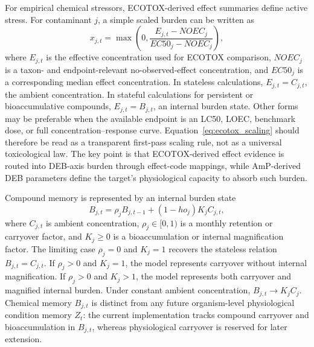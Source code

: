 For empirical chemical stressors, ECOTOX-derived effect summaries define active stress. For contaminant $j$, a simple scaled burden can be written as
\begin{equation}
  x_{j,t} = \max\left(0,\frac{E_{j,t}-NOEC_j}{EC50_j-NOEC_j}\right),
  \label{eq:ecotox_scaling}
\end{equation}
where $E_{j,t}$ is the effective concentration used for ECOTOX comparison, $NOEC_j$ is a taxon- and endpoint-relevant no-observed-effect concentration, and $EC50_j$ is a corresponding median effect concentration. In stateless calculations, $E_{j,t}=C_{j,t}$, the ambient concentration. In stateful calculations for persistent or bioaccumulative compounds, $E_{j,t}=B_{j,t}$, an internal burden state. Other forms may be preferable when the available endpoint is an LC50, LOEC, benchmark dose, or full concentration--response curve. Equation~\eqref{eq:ecotox_scaling} should therefore be read as a transparent first-pass scaling rule, not as a universal toxicological law. The key point is that ECOTOX-derived effect evidence is routed into DEB-axis burden through effect-code mappings, while AmP-derived DEB parameters define the target's physiological capacity to absorb such burden.

Compound memory is represented by an internal burden state
\begin{equation}
  B_{j,t}=\rho_j B_{j,t-1}+(1-
ho_j)K_j C_{j,t},
  \label{eq:compound_memory}
\end{equation}
where $C_{j,t}$ is ambient concentration, $\rho_j\in[0,1)$ is a monthly retention or carryover factor, and $K_j\geq 0$ is a bioaccumulation or internal magnification factor. The limiting case $\rho_j=0$ and $K_j=1$ recovers the stateless relation $B_{j,t}=C_{j,t}$. If $\rho_j>0$ and $K_j=1$, the model represents carryover without internal magnification. If $\rho_j>0$ and $K_j>1$, the model represents both carryover and magnified internal burden. Under constant ambient concentration, $B_{j,t}\rightarrow K_jC_j$. Chemical memory $B_{j,t}$ is distinct from any future organism-level physiological condition memory $Z_t$: the current implementation tracks compound carryover and bioaccumulation in $B_{j,t}$, whereas physiological carryover is reserved for later extension.


